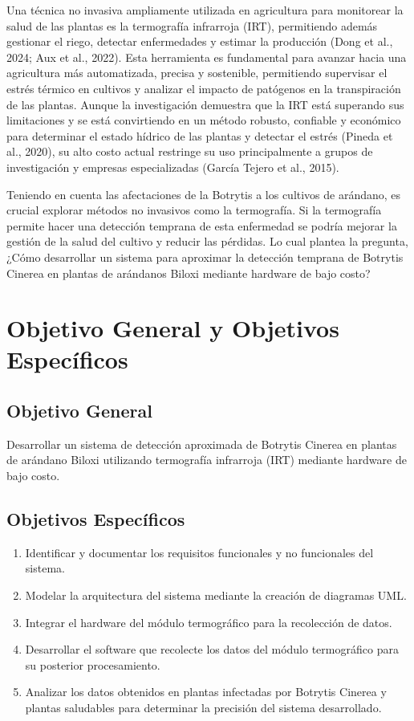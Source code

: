 \bigskip
Una técnica no invasiva ampliamente utilizada en agricultura para monitorear la salud de las plantas es la termografía infrarroja (IRT), permitiendo además gestionar el riego, detectar enfermedades y estimar la producción (Dong et al., 2024; Aux et al., 2022). Esta herramienta es fundamental para avanzar hacia una agricultura más automatizada, precisa y sostenible, permitiendo supervisar el estrés térmico en cultivos y analizar el impacto de patógenos en la transpiración de las plantas. Aunque la investigación demuestra que la IRT está superando sus limitaciones y se está convirtiendo en un método robusto, confiable y económico para determinar el estado hídrico de las plantas y detectar el estrés (Pineda et al., 2020), su alto costo actual restringe su uso principalmente a grupos de investigación y empresas especializadas (García Tejero et al., 2015).

\bigskip
Teniendo en cuenta las afectaciones de la Botrytis a los cultivos de arándano, es crucial explorar métodos no invasivos como la termografía. Si la termografía permite hacer una detección temprana de esta enfermedad se podría mejorar la gestión de la salud del cultivo y reducir las pérdidas. Lo cual plantea la pregunta, ¿Cómo desarrollar un sistema para aproximar la detección temprana de Botrytis Cinerea en plantas de arándanos Biloxi mediante hardware de bajo costo?


\section{Objetivo General y Objetivos Específicos}
\subsection{Objetivo General}
Desarrollar un sistema de detección aproximada de Botrytis Cinerea en plantas de arándano Biloxi utilizando termografía infrarroja (IRT) mediante hardware de bajo costo.

\subsection{Objetivos Específicos}
\begin{enumerate}
    \item Identificar y documentar los requisitos funcionales y no funcionales del sistema.
    \item Modelar la arquitectura del sistema mediante la creación de diagramas UML.
    \item Integrar el hardware del módulo termográfico para la recolección de datos.
    \item Desarrollar el software que recolecte los datos del módulo termográfico para su posterior procesamiento.
    \item Analizar los datos obtenidos en plantas infectadas por Botrytis Cinerea y plantas saludables para determinar la precisión del sistema desarrollado.
\end{enumerate}

